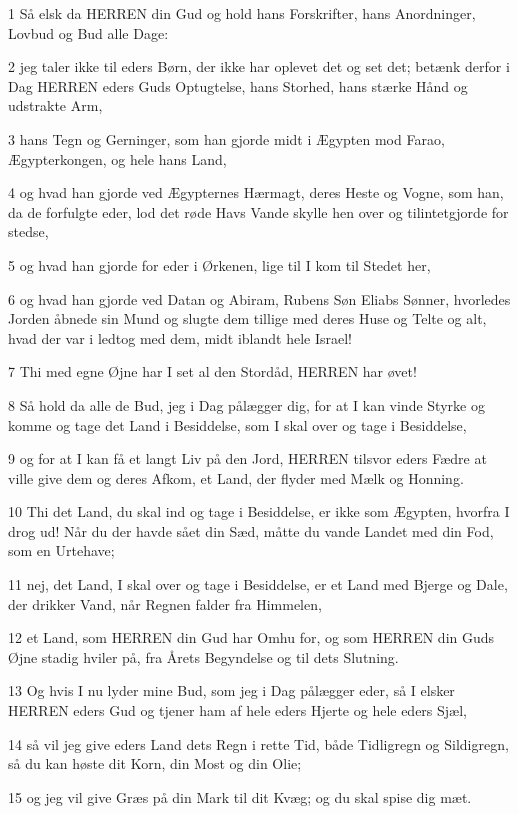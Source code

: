 \par 1 Så elsk da HERREN din Gud og hold hans Forskrifter, hans Anordninger, Lovbud og Bud alle Dage:
\par 2 jeg taler ikke til eders Børn, der ikke har oplevet det og set det; betænk derfor i Dag HERREN eders Guds Optugtelse, hans Storhed, hans stærke Hånd og udstrakte Arm,
\par 3 hans Tegn og Gerninger, som han gjorde midt i Ægypten mod Farao, Ægypterkongen, og hele hans Land,
\par 4 og hvad han gjorde ved Ægypternes Hærmagt, deres Heste og Vogne, som han, da de forfulgte eder, lod det røde Havs Vande skylle hen over og tilintetgjorde for stedse,
\par 5 og hvad han gjorde for eder i Ørkenen, lige til I kom til Stedet her,
\par 6 og hvad han gjorde ved Datan og Abiram, Rubens Søn Eliabs Sønner, hvorledes Jorden åbnede sin Mund og slugte dem tillige med deres Huse og Telte og alt, hvad der var i ledtog med dem, midt iblandt hele Israel!
\par 7 Thi med egne Øjne har I set al den Stordåd, HERREN har øvet!
\par 8 Så hold da alle de Bud, jeg i Dag pålægger dig, for at I kan vinde Styrke og komme og tage det Land i Besiddelse, som I skal over og tage i Besiddelse,
\par 9 og for at I kan få et langt Liv på den Jord, HERREN tilsvor eders Fædre at ville give dem og deres Afkom, et Land, der flyder med Mælk og Honning.
\par 10 Thi det Land, du skal ind og tage i Besiddelse, er ikke som Ægypten, hvorfra I drog ud! Når du der havde sået din Sæd, måtte du vande Landet med din Fod, som en Urtehave;
\par 11 nej, det Land, I skal over og tage i Besiddelse, er et Land med Bjerge og Dale, der drikker Vand, når Regnen falder fra Himmelen,
\par 12 et Land, som HERREN din Gud har Omhu for, og som HERREN din Guds Øjne stadig hviler på, fra Årets Begyndelse og til dets Slutning.
\par 13 Og hvis I nu lyder mine Bud, som jeg i Dag pålægger eder, så I elsker HERREN eders Gud og tjener ham af hele eders Hjerte og hele eders Sjæl,
\par 14 så vil jeg give eders Land dets Regn i rette Tid, både Tidligregn og Sildigregn, så du kan høste dit Korn, din Most og din Olie;
\par 15 og jeg vil give Græs på din Mark til dit Kvæg; og du skal spise dig mæt.
